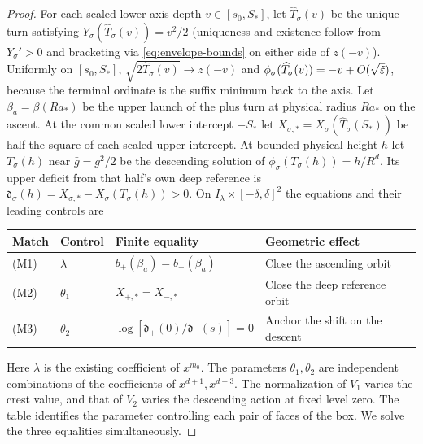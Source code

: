 \begin{proof}
For each scaled lower axis depth $v\in[s_0,S_*]$, let $\widehat T_\sigma(v)$ be the unique turn
satisfying $Y_\sigma(\widehat T_\sigma(v))=v^2/2$ (uniqueness and existence follow from $Y_\sigma'>0$
and bracketing via \eqref{eq:envelope-bounds} on either side of $z(-v)$). Uniformly on $[s_0,S_*]$,
$\sqrt{2\widehat T_\sigma(v)}\to z(-v)$ and $\phi_\sigma(\widehat
T_\sigma(v))=-v+O(\sqrt{\tilde{\varepsilon}})$, because the terminal ordinate is the suffix minimum back to the
axis. Let $\beta_a=\beta(Ra_*)$ be the upper launch of the plus turn
at physical radius $Ra_*$ on the ascent. At the common scaled lower
intercept $-S_*$ let $X_{\sigma,*}=X_\sigma(\widehat T_\sigma(S_*))$
be half the square of each scaled upper intercept. At bounded physical
height $h$ let $T_\sigma(h)$ near $\bar g=g^2/2$ be the descending
solution of $\phi_\sigma(T_\sigma(h))=h/R^d$. Its upper deficit from
that half's own deep reference is
$\mathfrak d_\sigma(h)=X_{\sigma,*}-X_\sigma(T_\sigma(h))>0$.
On $I_\lambda\times[-\delta,\delta]^2$ the equations and their
leading controls are
\begin{center}\small
\begin{tabular}{@{}ll ll@{}}
\toprule
Match & Control & Finite equality & Geometric effect\\
\midrule
(M1) & $\lambda$   & $b_+(\beta_a)=b_-(\beta_a)$
                 & Close the ascending orbit\\
(M2) & $\theta_1$ & $X_{+,*}=X_{-,*}$
                 & Close the deep reference orbit\\
(M3) & $\theta_2$ & $\log[\mathfrak d_+(0)/\mathfrak d_-(s)]=0$
                 & Anchor the shift on the descent\\
\bottomrule
\end{tabular}
\end{center}
Here $\lambda$ is the existing coefficient of $x^{m_0}$. The parameters
$\theta_1,\theta_2$ are independent combinations of the coefficients of
$x^{d+1},x^{d+3}$. The normalization of $V_1$ varies the crest value,
and that of $V_2$ varies the descending action at fixed level zero.
The table identifies the parameter controlling each pair of faces of
the box. We solve the three equalities simultaneously.


\end{proof}
